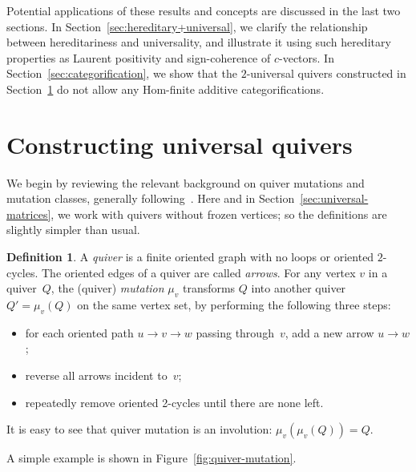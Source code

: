 \documentclass[10pt]{amsart}
\theoremstyle{definition}
\newtheorem{definition}[theorem]{Definition}
\begin{document}
Potential applications of these results and concepts are discussed 
in the last two sections. 
In Section~\ref{sec:hereditary+universal}, we clarify the relationship between hereditariness and universality, 
and illustrate it using such hereditary properties as 
Laurent positivity and sign-coherence of $c$-vectors. 
In Section~\ref{sec:categorification}, 
we show that the $2$-universal quivers constructed in 
Section~\ref{sec:constructing-universal-quivers}
do not allow any Hom-finite additive categorifications. 


\section{Constructing universal quivers}
\label{sec:constructing-universal-quivers}

We begin by reviewing the relevant background on quiver mutations and mutation classes, generally following~\cite[Sections~2.1, 2.6, 4.1]{FWZ}. 
Here and in Section~\ref{sec:universal-matrices}, 
we work with quivers without frozen vertices; so the definitions are slightly simpler than usual. 

\begin{definition}
\label{def:quiver-mutation}
A \emph{quiver} is a finite oriented graph with no loops or oriented $2$-cycles. The oriented edges of a quiver are called \emph{arrows}. For any vertex $v$ in a quiver~$Q$, the (quiver) \emph{mutation} $\mu_v$ transforms $Q$ into another quiver $Q'=\mu_v(Q)$ on the same vertex set, by performing the following three steps:
\begin{itemize} %
\item
for each oriented path $u\to v\to w$ passing through~$v$, add a new arrow
$u\to w$; 
\item
reverse all arrows incident to~$v$; 
\item
repeatedly remove oriented 2-cycles until there are none left.
\end{itemize}
\end{definition}

It is easy to see that quiver mutation is an involution: $\mu_v(\mu_v(Q))=Q$. 

A simple example is shown in Figure~\ref{fig:quiver-mutation}. 
\end{document}

